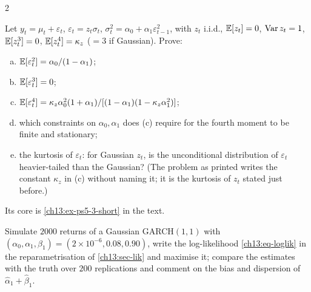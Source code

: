 \begin{paracol}{2}
\begin{exercise}\label{ch13:ex-ps5-3}
Let $y_t=\mu_t+\varepsilon_t$, $\varepsilon_t=z_t\sigma_t$, $\sigma_t^2=\alpha_0+\alpha_1\varepsilon_{t-1}^2$, with $z_t$ i.i.d., $\mathbb{E}[z_t]=0$, $\operatorname{Var} z_t=1$, $\mathbb{E}[z_t^3]=0$, $\mathbb{E}[z_t^4]=\kappa_z$ ($=3$ if Gaussian). Prove:
\begin{enumerate}[(a)]
  \item $\mathbb{E}[\varepsilon_t^2]=\alpha_0/(1-\alpha_1)$;
  \item $\mathbb{E}[\varepsilon_t^3]=0$;
  \item $\mathbb{E}[\varepsilon_t^4]=\kappa_z\alpha_0^2(1+\alpha_1)/[(1-\alpha_1)(1-\kappa_z\alpha_1^2)]$;
  \item which constraints on $\alpha_0,\alpha_1$ does (c) require for the fourth moment to be finite and stationary;
  \item the kurtosis of $\varepsilon_t$: for Gaussian $z_t$, is the unconditional distribution of $\varepsilon_t$ heavier-tailed than the Gaussian?
      (The problem as printed writes the constant $\kappa_z$ in (c) without naming it; it is the kurtosis of $z_t$ stated just before.)
\end{enumerate}
Its core is \cref{ch13:ex-ps5-3-short} in the text.
\end{exercise}

\begin{exercise}\label{ch13:ex-extra4}
Simulate $2000$ returns of a Gaussian GARCH$(1,1)$ with $(\alpha_0,\alpha_1,\beta_1)=(2\times10^{-6},0.08,0.90)$, write the log-likelihood \eqref{ch13:eq-loglik} in the reparametrisation of \cref{ch13:sec-lik} and maximise it; compare the estimates with the truth over $200$ replications and comment on the bias and dispersion of $\hat\alpha_1+\hat\beta_1$.
\end{exercise}


\end{paracol}
